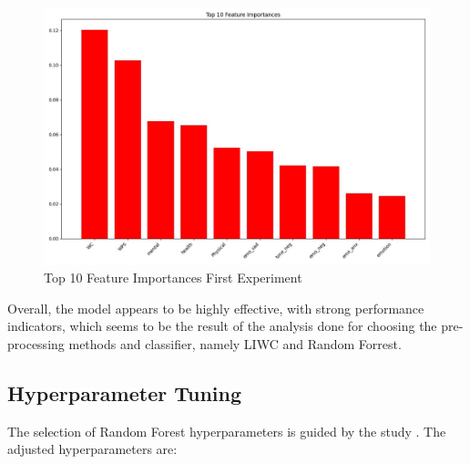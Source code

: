 \begin{figure}[htbp]
	\centering
		\includegraphics[scale=0.5]{LaTeX Bachelor Thesis Depression Signs Detection/figures/metrics/experiment1English/top10features.jpg}
	\caption{Top 10 Feature Importances First Experiment}
	\label{top10FeaturesFirstExperiment}
\end{figure}

Overall, the model appears to be highly effective, with strong performance indicators, which seems to be the result of the analysis done for choosing the pre-processing methods and classifier, namely LIWC \cite{boyd2022development} and Random Forrest.

\subsection{Hyperparameter Tuning}
The selection of Random Forest hyperparameters is guided by the study \cite{probst2019hyperparameters}. The adjusted hyperparameters are:

